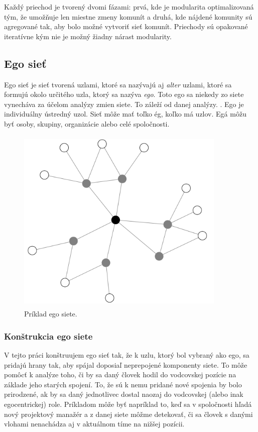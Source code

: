 \documentclass[slovak,master,public,dept460,male,cpdeclaration,oneside]{diploma}
\begin{document}
Každý priechod je tvorený dvomi fázami: prvá, kde je modularita optimalizovaná tým, že umožňuje len miestne zmeny komunít a druhá, kde nájdené komunity sú agregované tak, aby bolo možné vytvoriť sieť komunít. Priechody sú opakované iteratívne kým nie je možný žiadny nárast modularity.

\subsection{Ego sieť}

Ego sieť je sieť tvorená uzlami, ktoré sa nazývajú aj \textit{alter} uzlami, ktoré sa formujú okolo určitého uzla, ktorý sa nazýva \textit{ego}. Toto ego sa niekedy zo siete vynecháva za účelom analýzy zmien siete. To záleží od danej analýzy. \cite{21}. Ego je individuálny ústredný uzol. Sieť môže mať toľko ég, koľko má uzlov. Egá môžu byť osoby, skupiny, organizácie alebo celé spoločnosti.

\begin{figure}[H]
\centering
\includegraphics[width=10cm, height=9cm]{figures/egonet}
\caption{Príklad ego siete.}
\end{figure}

\subsubsection{Konštrukcia ego siete}
V tejto práci konštruujem ego sieť tak, že k uzlu, ktorý bol vybraný ako ego, sa pridajú hrany tak, aby spájal doposiaľ neprepojené komponenty siete. To môže pomôcť k analýze toho, či by sa daný človek hodil do vodcovskej pozície na základe jeho starých spojení. To, že sú k nemu pridané nové spojenia by bolo prirodzené, ak by sa daný jednotlivec dostal naozaj do vodcovskej (alebo inak egocentrickej) role. Príkladom môže byť napríklad to, keď sa v spoločnosti hľadá nový projektový manažér a z danej siete môžme detekovať, či sa človek s danými vlohami nenachádza aj v aktuálnom tíme na nižšej pozícii.
\end{document}
